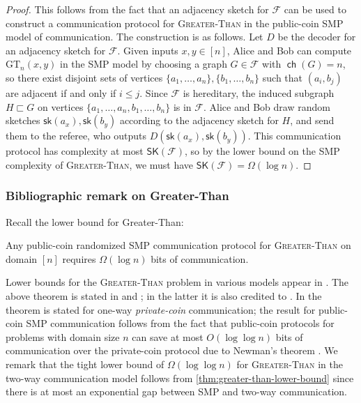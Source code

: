 \documentclass{theoretics}
\newcommand{\cF}{\ensuremath{\mathcal{F}}}
\newcommand{\sk}{\mathsf{sk}}
\newcommand{\RL}{\mathsf{SK}}
\DeclareMathOperator\ch{\mathsf{ch}}
\begin{document}
\lowerbound*
\begin{proof}
This follows from the fact that an adjacency sketch for $\cF$ can be used to construct a
communication protocol for \textsc{Greater-Than} in the public-coin SMP model of communication.  The construction is as follows. Let $D$ be the decoder for
an adjacency sketch for $\cF$. Given inputs $x,y \in [n]$, Alice and Bob can compute
$\mathrm{GT}_n(x,y)$ in the SMP model by choosing a graph $G \in \cF$ with $\ch(G)=n$, so there
exist disjoint sets of vertices $\{a_1, \dotsc, a_n\}, \{b_1, \dotsc, b_n\}$ such that $(a_i,b_j)$
are adjacent if and only if $i \leq j$.  Since $\cF$ is hereditary, the induced subgraph $H
\sqsubset G$ on vertices $\{a_1, \dotsc, a_n, b_1, \dotsc, b_n\}$ is in $\cF$. Alice and Bob draw
random sketches $\sk(a_x),\sk(b_y)$ according to the adjacency sketch for $H$, and send them to the
referee, who outputs $D(\sk(a_x),\sk(b_y))$. This communication protocol has complexity at most
$\RL(\cF)$, so by the lower bound on the SMP complexity of \textsc{Greater-Than}, we must have
$\RL(\cF) = \Omega(\log n)$.
\end{proof}

\subsubsection{Bibliographic remark on Greater-Than}
\label{app:lower-bound-greater-than}

Recall the lower bound for Greater-Than:
\begin{theorem}
\label{thm:greater-than-lower-bound}
Any public-coin randomized SMP communication protocol for \textsc{Greater-Than} on domain $[n]$
requires $\Omega(\log n)$ bits of communication.
\end{theorem}

Lower bounds for the \textsc{Greater-Than} problem in various models appear in \cite{KNR99, MNSW98,
Viol15, RS15, ATYY17}.  The above theorem is stated in \cite{KNR99} and \cite{MNSW98}; in the latter
it is also credited to \cite{Smir88}. In \cite{KNR99} the theorem is stated for one-way
\emph{private-coin} communication; the result for public-coin SMP communication follows from the
fact that public-coin protocols for problems with domain size $n$ can save at most $O(\log \log n)$
bits of communication over the private-coin protocol due to Newman's theorem \cite{New91}.
We remark that the tight lower bound of $\Omega(\log\log n)$ for \textsc{Greater-Than} in the two-way
communication model follows from \cref{thm:greater-than-lower-bound} since there is at most an
exponential gap between SMP and two-way communication.
\end{document}
